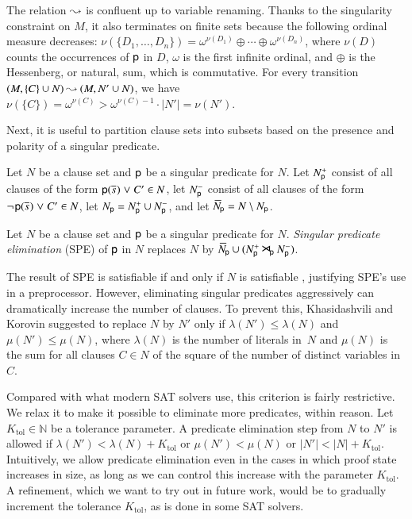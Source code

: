 \begin{conf}
The relation $\mathbin\leadsto$ is confluent up to variable renaming. Thanks to
the singularity constraint on $M$, it
also terminates on finite sets because the following ordinal measure decreases:
$\nu(\{D_1,\allowbreak\dotsc,\allowbreak D_n\}) = \omega^{\nu(D_1)} \oplus \cdots \oplus
\omega^{\nu(D_n)}$, where $\nu(D)$ counts the occurrences of $\mathsf{p}$ in
$D$, $\omega$ is the first infinite ordinal,
and $\oplus$ is the Hessenberg, or natural, sum, which is commutative.
For every transition
$(M, \{C\} \cup N) \mathbin\leadsto (M, N' \cup N)$, we have
$\nu(\{C\}) = \omega^{\nu(C)} > \omega^{\nu(C)-1} \cdot |N'| = \nu(N')$.
\end{conf}

Next, it is useful to partition
clause sets into subsets based on the presence and polarity of a singular
predicate.

\begin{defi}
   Let $N$ be a clause set and $\mathsf{p}$ be a singular predicate for
   $N.$ Let $N^+_{\mathsf{p}}$ consist of all clauses of the form ${\mathsf{p}(\overline{s}_{})} \mathrel{\lor} C' \in N$,
   let $N^-_{\mathsf{p}}$ consist of all clauses of the form $\neg{\kern.2ex \mathsf{p}(\overline{s}_{})} \mathrel{\lor} C' \in N$,
   let $N_{\mathsf{p}} = N^+_{\mathsf{p}} \cup N^-_{\mathsf{p}}$,
   and let $\,\overline{\!N}_{\!\mathsf{p}} = N \setminus N_{\mathsf{p}}$.
\end{defi}

\begin{defi}
   \label{def:pred-elim}
   Let $N$ be a clause set and $\mathsf{p}$ be a singular predicate for
   $N.$
   \emph{Singular predicate elimination} (SPE) of $\mathsf{p}$ in $N$ replaces $N$ by
   $\,\overline{\!N}_{\!\mathsf{p}} \cup (N^+_{\mathsf{p}} \mathbin{\smash{\hbox{\Large$\kern-.1ex\rtimes$}}}_{\!\mathsf{p}} N^-_{\mathsf{p}})$.
\end{defi}

The result of SPE is satisfiable if and only if $N$ is satisfiable
\cite[Theorem~1]{kk-2016-pe-fol}, justifying SPE's use in a preprocessor.
However, eliminating singular predicates aggressively can dramatically increase
the number of clauses. To prevent this, Khasidashvili and Korovin suggested to
replace $N$ by $N'$ only if $\lambda(N') \leq \lambda(N)$
and $\mu(N') \leq \mu(N)$, where
$\lambda(N)$ is the number of literals in~$N$ and
$\mu(N)$ is the sum for all clauses $C \in
N$ of the square of the number of distinct variables in $C$.

Compared with what modern SAT solvers use, this
criterion is fairly restrictive. We relax it to make it possible to
eliminate more predicates, within reason. Let $K_\mathrm{tol} \in \mathbb{N}$ be a tolerance
parameter. A predicate elimination
step from $N$ to $N'$ is allowed if
$\lambda(N') < \lambda(N) + K_\mathrm{tol}$ or
$\mu(N') < \mu(N)$ or
$|N'| < |N| + K_\mathrm{tol}$. Intuitively, we allow predicate elimination
even in the cases in which proof state increases in size, as long as we can control
this increase with the parameter $K_\mathrm{tol}$. 
A refinement, which we want to try out in future work, would be to gradually
increment the tolerance $K_\mathrm{tol}$, as is done in some SAT solvers.


